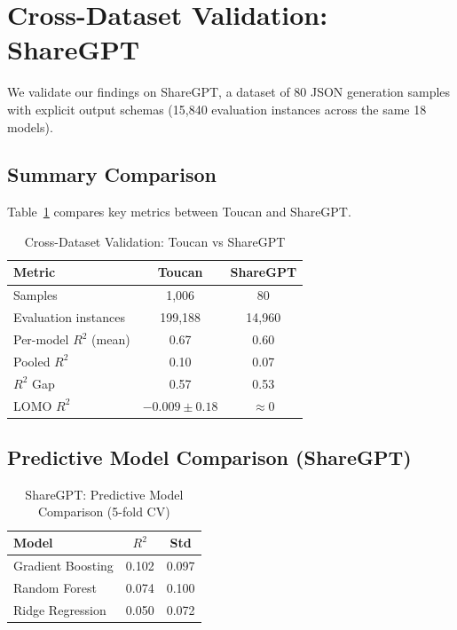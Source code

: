 \documentclass[sigconf,anonymous,review]{acmart}
\begin{document}
\section{Cross-Dataset Validation: ShareGPT}
\label{app:sharegpt}

We validate our findings on ShareGPT, a dataset of 80 JSON generation samples with explicit output schemas (15,840 evaluation instances across the same 18 models).

\subsection{Summary Comparison}

Table~\ref{tab:cross_dataset} compares key metrics between Toucan and ShareGPT.

\begin{table}[h]
\centering
\caption{Cross-Dataset Validation: Toucan vs ShareGPT}
\label{tab:cross_dataset}
\small
\begin{tabular}{@{}lcc@{}}
\toprule
\textbf{Metric} & \textbf{Toucan} & \textbf{ShareGPT} \\
\midrule
Samples & 1,006 & 80 \\
Evaluation instances & 199,188 & 14,960 \\
\midrule
Per-model $R^2$ (mean) & 0.67 & 0.60 \\
Pooled $R^2$ & 0.10 & 0.07 \\
$R^2$ Gap & 0.57 & 0.53 \\
\midrule
LOMO $R^2$ & $-0.009 \pm 0.18$ & $\approx 0$ \\
\bottomrule
\end{tabular}
\end{table}

\subsection{Predictive Model Comparison (ShareGPT)}

\begin{table}[h]
\centering
\caption{ShareGPT: Predictive Model Comparison (5-fold CV)}
\label{tab:sharegpt_model_comparison}
\small
\begin{tabular}{@{}lcc@{}}
\toprule
\textbf{Model} & \textbf{$R^2$} & \textbf{Std} \\
\midrule
Gradient Boosting & 0.102 & 0.097 \\
Random Forest & 0.074 & 0.100 \\
Ridge Regression & 0.050 & 0.072 \\
\bottomrule
\end{tabular}
\end{table}
\end{document}
